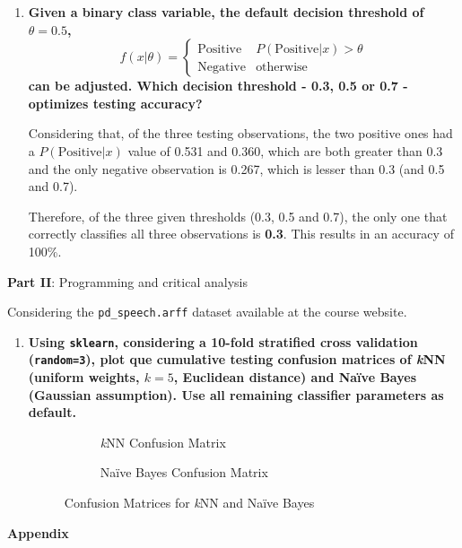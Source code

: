\documentclass[12pt]{article}
\begin{document}
\begin{enumerate}[leftmargin=\labelsep,resume]
    \item {\bfseries
          Given a binary class variable, the default decision threshold of $\theta = 0.5$,
          $$
              f(x|\theta) = \begin{cases}
                  \text{Positive} & P(\text{Positive}|x) > \theta \\
                  \text{Negative} & \text{otherwise}
              \end{cases}
          $$
          can be adjusted.
          Which decision threshold - 0.3, 0.5 or 0.7 - optimizes testing accuracy?
          }

          Considering that, of the three testing observations,
          the two positive ones had a $P(\text{Positive}|x)$ value
          of 0.531 and 0.360, which are both greater than 0.3
          and the only negative observation is 0.267, which is lesser
          than 0.3 (and 0.5 and 0.7).

          Therefore, of the three given thresholds (0.3, 0.5 and 0.7),
          the only one that correctly classifies all three observations
          is \textbf{0.3}. This results in an accuracy of 100\%.


\end{enumerate}

\begin{center}
    \large{\textbf{Part II}: Programming and critical analysis}
\end{center}

Considering the \texttt{pd\_speech.arff} dataset available at the course website.

\begin{enumerate}[leftmargin=\labelsep,resume]
    \item {\bfseries
          Using \texttt{sklearn}, considering a 10-fold stratified cross validation
          (\texttt{random=3}), plot que cumulative testing confusion matrices of
          \textit{k}NN (uniform weights, $k = 5$, Euclidean distance) and Naïve Bayes
          (Gaussian assumption). Use all remaining classifier parameters as default.
          }

          \begin{figure}[H]
              \centering
              \begin{subfigure}{0.49\textwidth}
                  \centering
                  
                  \caption{\textit{k}NN Confusion Matrix}
                  \label{fig:confusion-knn}
              \end{subfigure}
              \begin{subfigure}{0.49\textwidth}
                  \centering
                  
                  \caption{Naïve Bayes Confusion Matrix}
                  \label{fig:confusion-naive-bayes}
              \end{subfigure}
              \caption{Confusion Matrices for \textit{k}NN and Naïve Bayes}
              \label{fig:confusion-matrices}
          \end{figure}
\end{enumerate}

\center\large{\textbf{Appendix}\vskip 0.3cm}
\end{document}
